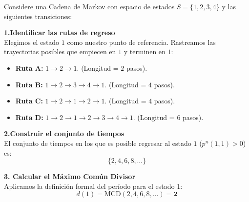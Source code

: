 \documentclass[10pt,a4paper]{article}
\begin{document}
\vspace{5mm}

\begin{tcolorbox}[enhanced, colback=white, colframe=gray!50!black, arc=2mm, 
                  title=\textbf{Ejemplo Aplicado para comprensión},
                  fonttitle=\bfseries, coltitle=white, drop shadow]

Considere una Cadena de Markov con espacio de estados $S = \{1, 2, 3, 4\}$ y las siguientes transiciones:

\begin{center}
\end{center}

\textbf{1.Identificar las rutas de regreso } \\
Elegimos el estado $1$ como nuestro punto de referencia. Rastreamos las trayectorias posibles que empiecen en $1$ y terminen en $1$:
\begin{itemize}
    \item \textbf{Ruta A:} $1 \to 2 \to 1$. (Longitud = $2$ pasos).
    \item \textbf{Ruta B:} $1 \to 2 \to 3 \to 4 \to 1$. (Longitud = $4$ pasos).
    \item \textbf{Ruta C:} $1 \to 2 \to 1 \to 2 \to 1$. (Longitud = $4$ pasos).
    \item \textbf{Ruta D:} $1 \to 2 \to 1 \to 2 \to 3 \to 4 \to 1$. (Longitud = $6$ pasos).
\end{itemize}

\textbf{2.Construir el conjunto de tiempos} \\
El conjunto de tiempos en los que es posible regresar al estado $1$ ($p^n(1,1) > 0$) es:
\[ \{2, 4, 6, 8, \dots\} \]

\textbf{3. Calcular el Máximo Común Divisor } \\
Aplicamos la definición formal del período para el estado 1:
\[ d(1) = \text{MCD}(2, 4, 6, 8, \dots) = \mathbf{2} \]


\end{tcolorbox}
\end{document}
